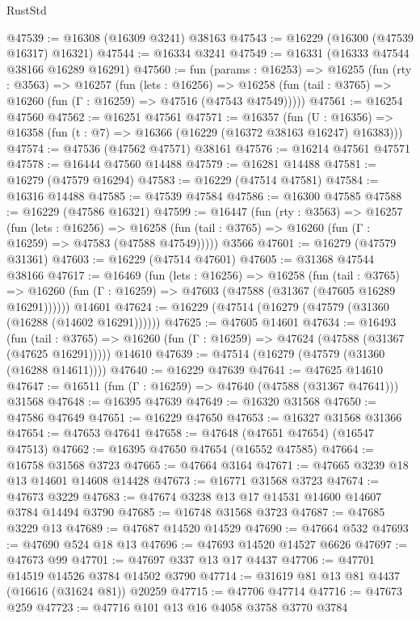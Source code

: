 \begin{lexlean}{RustStd}
\begin{coremodule}
@47539 := @16308 (@16309 @3241) @38163
@47543 := @16229 (@16300 (@47539 @16317) @16321)
@47544 := @16334 @3241
@47549 := @16331 (@16333 @47544 @38166 @16289 @16291)
@47560 := fun (params : @16253) =>
  @16255
    (fun (rty : @3563) =>
    @16257
      (fun (lets : @16256) =>
      @16258 (fun (tail : @3765) => @16260 (fun (Γ : @16259) => @47516 (@47543 @47549)))))
@47561 := @16254 @47560
@47562 := @16251 @47561
@47571 := @16357
    (fun (U : @16356) => @16358 (fun (t : @7) => @16366 (@16229 (@16372 @38163 @16247) @16383)))
@47574 := @47536 (@47562 @47571) @38161
@47576 := @16214 @47561 @47571
@47578 := @16444 @47560 @14488
@47579 := @16281 @14488
@47581 := @16279 (@47579 @16294)
@47583 := @16229 (@47514 @47581)
@47584 := @16316 @14488
@47585 := @47539 @47584
@47586 := @16300 @47585
@47588 := @16229 (@47586 @16321)
@47599 := @16447
    (fun (rty : @3563) =>
    @16257
      (fun (lets : @16256) =>
      @16258 (fun (tail : @3765) => @16260 (fun (Γ : @16259) => @47583 (@47588 @47549)))))
    @3566
@47601 := @16279 (@47579 @31361)
@47603 := @16229 (@47514 @47601)
@47605 := @31368 @47544 @38166
@47617 := @16469
    (fun (lets : @16256) =>
    @16258
      (fun (tail : @3765) =>
      @16260 (fun (Γ : @16259) => @47603 (@47588 (@31367 (@47605 @16289 @16291))))))
    @14601
@47624 := @16229 (@47514 (@16279 (@47579 (@31360 (@16288 (@14602 @16291))))))
@47625 := @47605 @14601
@47634 := @16493
    (fun (tail : @3765) => @16260 (fun (Γ : @16259) => @47624 (@47588 (@31367 (@47625 @16291)))))
    @14610
@47639 := @47514 (@16279 (@47579 (@31360 (@16288 @14611))))
@47640 := @16229 @47639
@47641 := @47625 @14610
@47647 := @16511 (fun (Γ : @16259) => @47640 (@47588 (@31367 @47641))) @31568
@47648 := @16395 @47639
@47649 := @16320 @31568
@47650 := @47586 @47649
@47651 := @16229 @47650
@47653 := @16327 @31568 @31366
@47654 := @47653 @47641
@47658 := @47648 (@47651 @47654) (@16547 @47513)
@47662 := @16395 @47650 @47654 (@16552 @47585)
@47664 := @16758 @31568 @3723
@47665 := @47664 @3164
@47671 := @47665 @3239 @18 @13 @14601 @14608 @14428
@47673 := @16771 @31568 @3723
@47674 := @47673 @3229
@47683 := @47674 @3238 @13 @17 @14531 @14600 @14607 @3784 @14494 @3790
@47685 := @16748 @31568 @3723
@47687 := @47685 @3229 @13
@47689 := @47687 @14520 @14529
@47690 := @47664 @532
@47693 := @47690 @524 @18 @13
@47696 := @47693 @14520 @14527 @6626
@47697 := @47673 @99
@47701 := @47697 @337 @13 @17 @4437
@47706 := @47701 @14519 @14526 @3784 @14502 @3790
@47714 := @31619 @81 @13 @81 @4437 (@16616 (@31624 @81)) @20259
@47715 := @47706 @47714
@47716 := @47673 @259
@47723 := @47716 @101 @13 @16 @4058 @3758 @3770 @3784

\end{coremodule}
\end{lexlean}
